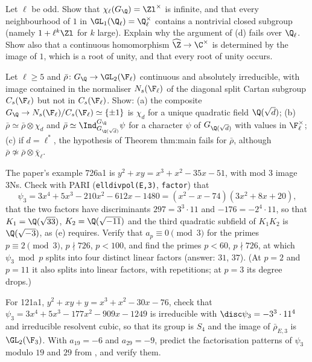 \begin{exercise}\label{exer:galois:small-subgroups}
Let $\ell$ be odd. Show that $\chi_\ell(G_\Q)=\Zl^\times$ is infinite, and that every neighbourhood of $1$ in $\GL_1(\Q_\ell)=\Q_\ell^\times$ contains a nontrivial closed subgroup
(namely $1+\ell^k\Zl$ for $k$ large). Explain why the argument of (d) fails over $\Q_\ell$. Show also that a continuous homomorphism
$\widehat\Z\to\C^\times$ is determined by the image of $1$, which is a root of unity, and that every root of unity occurs.
\end{exercise}

\begin{exercise}\label{exer:galois:dihedral}
Let $\ell\ge5$ and $\bar\rho\colon G_\Q\to\GL_2(\F_\ell)$ continuous and absolutely irreducible, with image contained in the normaliser $N_s(\F_\ell)$ of the diagonal split
Cartan subgroup $C_s(\F_\ell)$ but not in $C_s(\F_\ell)$. Show: (a) the composite $G_\Q\to N_s(\F_\ell)/C_s(\F_\ell)\simeq\{\pm1\}$ is $\chi_d$ for a unique quadratic field $\Q(\sqrt d)$;
(b) $\bar\rho\simeq\bar\rho\otimes\chi_d$ and $\bar\rho\simeq\Ind_{G_{\Q(\sqrt d)}}^{G_\Q}\psi$ for a character $\psi$ of $G_{\Q(\sqrt d)}$ with values in $\F_\ell^\times$; (c) if $d=\ell^*$, the
hypothesis of Theorem thm:main fails for $\bar\rho$, although $\bar\rho\not\simeq\bar\rho\otimes\bar\chi_\ell$.
\end{exercise}

\begin{exercise}\label{exer:galois:726}
The paper's example 726a1 is $y^2+xy=x^3+x^2-35x-51$, with mod $3$ image 3Ns. Check with PARI (\texttt{elldivpol(E,3)}, \texttt{factor}) that
\[
\psi_3=3x^4+5x^3-210x^2-612x-1480=(x^2-x-74)(3x^2+8x+20),
\]
that the two factors have discriminants $297=3^3\cdot11$ and $-176=-2^4\cdot11$, so that $K_1=\Q(\sqrt{33})$, $K_2=\Q(\sqrt{-11})$ and the third quadratic subfield of $K_1K_2$ is
$\Q(\sqrt{-3})$, as (e) requires. Verify that $a_p\equiv0\pmod 3$ for the primes $p\equiv2\pmod3$, $p\nmid726$, $p<100$, and find the
primes $p<60$, $p\nmid726$, at which $\psi_3\bmod p$ splits into four distinct linear factors (answer: $31$, $37$). (At $p=2$ and $p=11$ it also splits into linear factors,
with repetitions; at $p=3$ its degree drops.)
\end{exercise}

\begin{exercise}\label{exer:galois:121}
For 121a1, $y^2+xy+y=x^3+x^2-30x-76$, check that $\psi_3=3x^4+5x^3-177x^2-909x-1249$ is irreducible with $\disc\psi_3=-3^3\cdot11^4$ and irreducible resolvent cubic, so
that its group is $S_4$ and the image of $\bar\rho_{E,3}$ is $\GL_2(\F_3)$. With $a_{19}=-6$ and $a_{29}=-9$, predict the factorisation patterns of $\psi_3$ modulo $19$ and $29$
from , and verify them.
\end{exercise}

